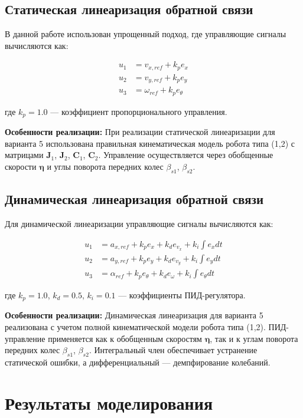 \subsection{Статическая линеаризация обратной связи}

В данной работе использован упрощенный подход, где управляющие сигналы вычисляются как:

\begin{align}
u_1 &= v_{x,ref} + k_p e_x \\
u_2 &= v_{y,ref} + k_p e_y \\
u_3 &= \omega_{ref} + k_p e_\theta
\end{align}

где $k_p = 1.0$ --- коэффициент пропорционального управления.

\textbf{Особенности реализации:} При реализации статической линеаризации для варианта 5 использована правильная кинематическая модель робота типа (1,2) с матрицами $\mathbf{J}_1$, $\mathbf{J}_2$, $\mathbf{C}_1$, $\mathbf{C}_2$. Управление осуществляется через обобщенные скорости $\boldsymbol{\eta}$ и углы поворота передних колес $\beta_{s1}$, $\beta_{s2}$.

\subsection{Динамическая линеаризация обратной связи}

Для динамической линеаризации управляющие сигналы вычисляются как:

\begin{align}
u_1 &= a_{x,ref} + k_p e_x + k_d e_{v_x} + k_i \int e_x dt \\
u_2 &= a_{y,ref} + k_p e_y + k_d e_{v_y} + k_i \int e_y dt \\
u_3 &= \alpha_{ref} + k_p e_\theta + k_d e_\omega + k_i \int e_\theta dt
\end{align}

где $k_p = 1.0$, $k_d = 0.5$, $k_i = 0.1$ --- коэффициенты ПИД-регулятора.

\textbf{Особенности реализации:} Динамическая линеаризация для варианта 5 реализована с учетом полной кинематической модели робота типа (1,2). ПИД-управление применяется как к обобщенным скоростям $\boldsymbol{\eta}$, так и к углам поворота передних колес $\beta_{s1}$, $\beta_{s2}$. Интегральный член обеспечивает устранение статической ошибки, а дифференциальный --- демпфирование колебаний.

\section{Результаты моделирования}

